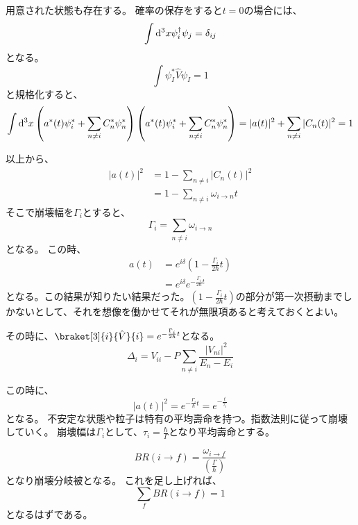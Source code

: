 \documentclass[titlepage]{ltjsarticle}
\newcommand{\mel}[3]{\braket[3]{#1}{#2}{#3}}
\begin{document}
用意された状態も存在する。
確率の保存をすると\(t=0\)の場合には、
\begin{equation}
  \int \odif[order=3]{x} \psi_i^\dagger \psi_j = \delta_{ij}
\end{equation}
となる。
\begin{equation}
  \int \psi_I^\ast \hat{V} \psi_I =1 
\end{equation}
と規格化すると、
\begin{equation}
  \int \odif[order=3]{x} \left( a^\ast (t) \psi^\ast _i + \sum_{n\ne i} C_n^\ast \psi^\ast_n  \right)\left( a^\ast (t) \psi^\ast _i + \sum_{n\ne i} C_n^\ast \psi^\ast_n  \right) = |a(t)|^2 + \sum_{n\ne i} |C_n(t)|^2 = 1
\end{equation}

以上から、
\begin{align}
  |a(t)|^2 &  = 1 - \sum_{n\ne i} |C_n(t)|^2\\
  & = 1 - \sum_{n\ne i} \omega_{i\to n} t 
\end{align}
そこで崩壊幅を\(\Gamma_i\)とすると、
\begin{equation}
  \Gamma_i = \sum_{n\ne i} \omega_{i\to n}
\end{equation}
となる。
この時、
\begin{align}
  a(t) & = e^{i \delta} \left( 1 - \frac{\Gamma_i}{2 \hbar}t \right) \\
  & = e^{i \delta} e^{-\frac{\Gamma_i}{2 \hbar}t}
\end{align}
となる。この結果が知りたい結果だった。\(\left( 1 - \frac{\Gamma_i}{2 \hbar}t \right)\)の部分が第一次摂動までしかないとして、それを想像を働かせてそれが無限項あると考えておくとよい。

その時に、\(\mel{i}{\hat{V}}{i}=e^{-\frac{\Gamma_i}{2 \hbar}t}\)となる。
\begin{equation}
  \Delta_i = V_{ii} - P \sum_{n\ne i} \frac{|V_{ni}|^2}{E_n-E_i}
\end{equation}

この時に、
\begin{equation}
  |a(t)|^2 = e^{-\frac{\Gamma_i}{\hbar}t} = e^{-\frac{t}{\tau_i}}
\end{equation}
となる。
不安定な状態や粒子は特有の平均壽命を持つ。指数法則に従って崩壊していく。
崩壊幅は\(\Gamma_i\)として、\(\tau_i=\frac{\hbar}{\Gamma}\)となり平均壽命とする。

\begin{equation}
  BR(i \to f) = \frac{\omega_{i\to f}}{\left( \frac{\Gamma}{\hbar} \right)}
\end{equation}
となり崩壊分岐被となる。
これを足し上げれば、
\begin{equation}
  \sum_{f} BR(i \to f) = 1
\end{equation}
となるはずである。
\end{document}
